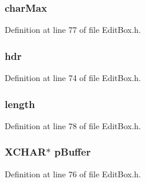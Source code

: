 \subsubsection[{char\+Max}]{ char\+Max}\label{struct_e_d_i_t_b_o_x_a784b87b4a682a1bf98cb5d274c61fa80}


Definition at line 77 of file Edit\+Box.\+h.

\hypertarget{struct_e_d_i_t_b_o_x_abeffaf353197a8a64fba6707b68ce0be}{}
\subsubsection[{hdr}]{ hdr}\label{struct_e_d_i_t_b_o_x_abeffaf353197a8a64fba6707b68ce0be}


Definition at line 74 of file Edit\+Box.\+h.

\hypertarget{struct_e_d_i_t_b_o_x_ac03f72dfd2e32790101f1221796ea289}{}
\subsubsection[{length}]{ length}\label{struct_e_d_i_t_b_o_x_ac03f72dfd2e32790101f1221796ea289}


Definition at line 78 of file Edit\+Box.\+h.

\hypertarget{struct_e_d_i_t_b_o_x_a7f974d9e1124eb06338cad8c815a4fec}{}
\subsubsection[{p\+Buffer}]{\setlength{\rightskip}{0pt plus 5cm}X\+C\+H\+A\+R$\ast$ p\+Buffer}\label{struct_e_d_i_t_b_o_x_a7f974d9e1124eb06338cad8c815a4fec}


Definition at line 76 of file Edit\+Box.\+h.

\hypertarget{struct_e_d_i_t_b_o_x_a40fa9c35391b0005032180b85e7afd34}{}
